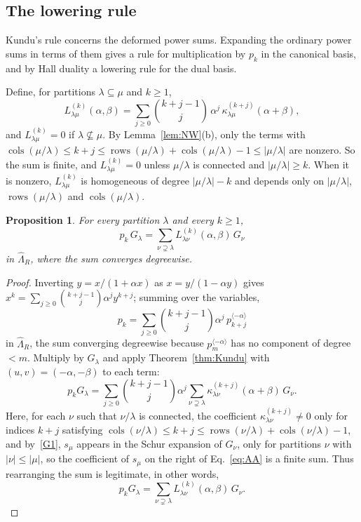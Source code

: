 \documentclass[11pt]{amsart}
\numberwithin{equation}{section}
\newtheorem{proposition}[theorem]{Proposition}
\theoremstyle{definition}
\theoremstyle{remark}
\newcommand{\hLam}{\widehat\Lambda}
\newcommand{\rows}{\operatorname{rows}}
\newcommand{\cols}{\operatorname{cols}}
\begin{document}
\subsection{The lowering rule}

Kundu's rule concerns the deformed power sums. Expanding the ordinary power
sums in terms of them gives a rule for multiplication by $p_k$ in the
canonical basis, and by Hall duality a lowering rule for the dual basis.

Define, for partitions $\lambda\subseteq\mu$ and $k\geq1$,
\begin{equation}\label{eq:L-def}
 L^{(k)}_{\lambda\mu}(\alpha,\beta)
 =\sum_{j\geq0}\binom{k+j-1}{j}\,\alpha^j\,
  \kappa^{(k+j)}_{\lambda\mu}(\alpha+\beta),
\end{equation}
and $L^{(k)}_{\lambda\mu}=0$ if $\lambda\not\subseteq\mu$. By
Lemma~\ref{lem:NW}(b), only the terms with
$\cols(\mu/\lambda)\leq k+j\leq\rows(\mu/\lambda)+\cols(\mu/\lambda)-1\leq|\mu/\lambda|$
are nonzero. So the sum is finite, and $L^{(k)}_{\lambda\mu}=0$ unless
$\mu/\lambda$ is connected and $|\mu/\lambda|\geq k$. When it is nonzero,
$L^{(k)}_{\lambda\mu}$ is homogeneous of degree $|\mu/\lambda|-k$ and depends only on $|\mu/\lambda|$, $\rows(\mu/\lambda)$ and $\cols(\mu/\lambda)$.

\begin{proposition}\label{prop:G-side}
For every partition $\lambda$ and every $k\geq1$,
\[
 p_k\,G_\lambda=\sum_{\nu\supsetneq\lambda}L^{(k)}_{\lambda\nu}(\alpha,\beta)\,G_\nu
\]
in $\hLam_R$, where the sum converges degreewise.
\end{proposition}

\begin{proof}
Inverting $y=x/(1+\alpha x)$ as $x=y/(1-\alpha y)$ gives
$x^k=\sum_{j\geq0}\binom{k+j-1}{j}\alpha^jy^{k+j}$; summing over the
variables,
\begin{equation}\label{eq:power-sum-inversion}
 p_k=\sum_{j\geq0}\binom{k+j-1}{j}\alpha^j\,p^{\langle-\alpha\rangle}_{k+j}
\end{equation}
in $\hLam_R$, the sum converging degreewise because
$p^{\langle-\alpha\rangle}_m$ has no component of degree $<m$. Multiply by
$G_\lambda$ and apply Theorem~\ref{thm:Kundu} with $(u,v)=(-\alpha,-\beta)$
to each term:
\begin{equation}
    \label{eq:AA}
    p_kG_\lambda=\sum_{j\geq0}\binom{k+j-1}{j}\alpha^j
 \sum_{\nu\supsetneq\lambda}\kappa^{(k+j)}_{\lambda\nu}(\alpha+\beta)\,G_\nu.
\end{equation}
Here, for each $\nu$ such that $\nu/\lambda$ is connected, the coefficient $\kappa^{(k+j)}_{\lambda\nu}\neq0$ only for indices $k+j$ satisfying $\cols(\nu/\lambda) \leq k+j\leq \rows(\nu/\lambda) + \cols(\nu/\lambda) -1$, and by~\ref{G1}, $s_{\mu}$ appears in the Schur expansion of $G_{\nu}$, only for partitions $\nu$ with
$|\nu|\leq |\mu|$, so the coefficient of $s_{\mu}$ on the right of Eq.~\eqref{eq:AA} is a finite sum. Thus rearranging the sum is legitimate, in other words,
\[
p_kG_\lambda =\sum_{\nu\supsetneq\lambda} L^{(k)}_{\lambda\nu}(\alpha,\beta)\,G_\nu.
\]
\end{proof}
\end{document}

